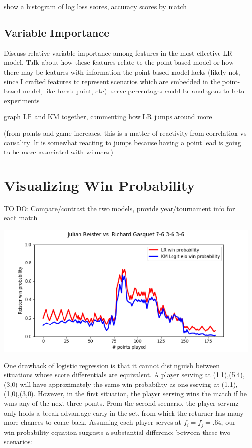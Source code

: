 \documentclass[chapterprefix=false]{report}
\begin{document}
show a histogram of log loss scores, accuracy scores by match



\subsection{Variable Importance}

Discuss relative variable importance among features in the most effective LR model. Talk about how these features relate to the point-based model or how there may be features with information the point-based model lacks (likely not, since I crafted features to represent scenarios which are embedded in the point-based model, like break point, etc). serve percentages could be analogous to beta experiments

graph LR and KM together, commenting how LR jumps around more

(from points and game increases, this is a matter of reactivity from correlation vs causality; lr is somewhat reacting to jumps because having a point lead is going to be more associated with winners.)

\section{Visualizing Win Probability}

TO DO: Compare/contrast the two models, provide year/tournament info for each match

\includegraphics[scale=.7]{reister_gasquet}

One drawback of logistic regression is that it cannot distinguish between situations whose score differentials are equivalent. A player serving at (1,1),(5,4),(3,0) will have approximately the same win probability as one serving at (1,1),(1,0),(3,0). However, in the first situation, the player serving wins the match if he wins any of the next three points. From the second scenario, the player serving only holds a break advantage early in the set, from which the returner has many more chances to come back. Assuming each player serves at $f_i=f_j=.64$, our win-probability equation suggests a substantial difference between these two scenarios:
\end{document}
